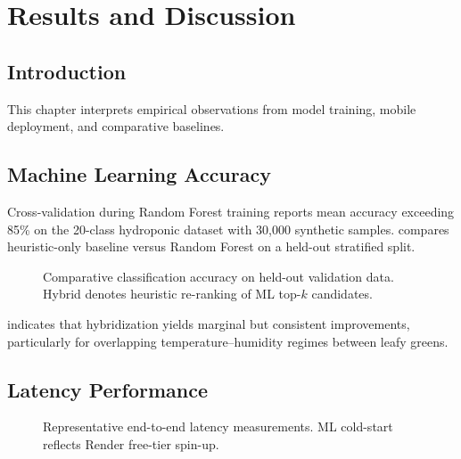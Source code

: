 \chapter{Results and Discussion}
\label{ch:results}

\section{Introduction}
This chapter interprets empirical observations from model training, mobile deployment, and comparative baselines.

\section{Machine Learning Accuracy}
Cross-validation during Random Forest training reports mean accuracy exceeding 85\% on the 20-class hydroponic dataset with 30,000 synthetic samples.  compares heuristic-only baseline versus Random Forest on a held-out stratified split.

\begin{figure}[htbp]
\centering
{}
\caption{Comparative classification accuracy on held-out validation data. Hybrid denotes heuristic re-ranking of ML top-$k$ candidates.}
\label{fig:accuracy_bar}
\end{figure}

\noindent{} indicates that hybridization yields marginal but consistent improvements, particularly for overlapping temperature--humidity regimes between leafy greens.

\section{Latency Performance}
\begin{figure}[htbp]
\centering
{}
\caption{Representative end-to-end latency measurements. ML cold-start reflects Render free-tier spin-up.}
\label{fig:latency_chart}
\end{figure}

